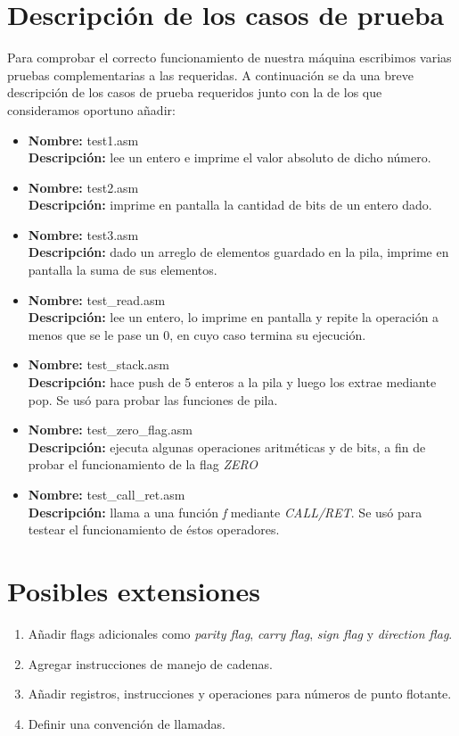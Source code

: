 \documentclass[a4paper,12pt]{article}
\begin{document}
\section{Descripci\'on de los casos de prueba}

Para comprobar el correcto funcionamiento de nuestra m\'aquina escribimos varias pruebas complementarias a las requeridas. A continuaci\'on se da una breve descripci\'on de los casos de prueba requeridos junto con la de los que consideramos oportuno añadir:
\begin{itemize}
\item
\textbf{Nombre:} test1.asm\\
\textbf{Descripci\'on:} lee un entero e imprime el valor absoluto de dicho n\'umero.
\item
\textbf{Nombre:} test2.asm\\
\textbf{Descripci\'on:} imprime en pantalla la cantidad de bits de un entero dado.
\item
\textbf{Nombre:} test3.asm\\
\textbf{Descripci\'on:} dado un arreglo de elementos guardado en la pila, imprime en pantalla la suma de sus elementos.
\item
\textbf{Nombre:} test\_read.asm\\
\textbf{Descripci\'on:} lee un entero, lo imprime en pantalla y repite la operaci\'on a menos que se le pase un 0, en cuyo caso termina su ejecuci\'on.
\item
\textbf{Nombre:} test\_stack.asm\\
\textbf{Descripci\'on:} hace push de 5 enteros a la pila y luego los extrae mediante pop. Se us\'o para probar las funciones de pila.
\item
\textbf{Nombre:} test\_zero\_flag.asm\\
\textbf{Descripci\'on:} ejecuta algunas operaciones aritm\'eticas y de bits, a fin de probar el funcionamiento de la flag \emph{ZERO}
\item
\textbf{Nombre:} test\_call\_ret.asm\\
\textbf{Descripci\'on:} llama a una funci\'on \emph f mediante \emph{CALL/RET}. Se us\'o para testear el funcionamiento de \'estos operadores.
\end{itemize}

\section{Posibles extensiones}

\begin{enumerate}
\item Añadir flags adicionales como \emph{parity flag}, \emph{carry flag}, \emph{sign flag} y \emph{direction flag}.
\item Agregar instrucciones de manejo de cadenas.
\item Añadir registros, instrucciones y operaciones para n\'umeros de punto flotante.
\item Definir una convenci\'on de llamadas.
\end{enumerate}
\end{document}
